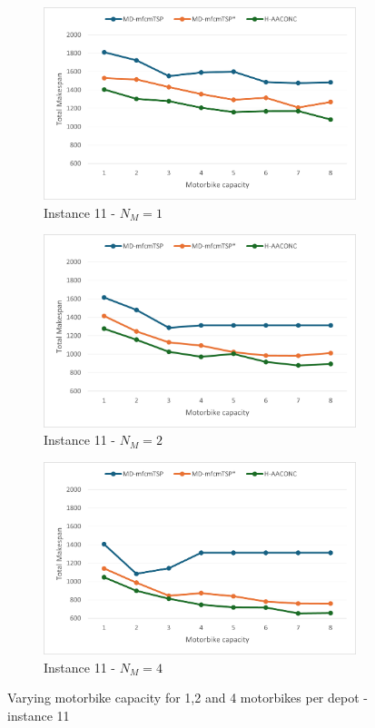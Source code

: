 \documentclass{article}
\begin{document}
	\begin{figure}[h]
		\centering
		\begin{subfigure}{0.33\textwidth}
			\centering
			\includegraphics[scale=0.42]{p11_NM1}\;
			\caption{Instance 11 - $N_M=1$}
			\label{fig:p11_NM1}
		\end{subfigure}
		\begin{subfigure}{0.33\textwidth}
			\centering
			\includegraphics[scale=0.42]{p11_NM2}\;
			\caption{Instance 11 - $N_M=2$}
			\label{fig:p11_NM2}
		\end{subfigure}
		\begin{subfigure}{0.33\textwidth}
			\centering
			\includegraphics[scale=0.42]{p11_NM4}\;
			\caption{Instance 11 - $N_M=4$}
			\label{fig:p11_NM4}
		\end{subfigure}
		\caption{Varying motorbike capacity for 1,2 and 4 motorbikes per depot - instance 11}
		\label{fig:motorbike_exp_p11}
	\end{figure}
\end{document}
